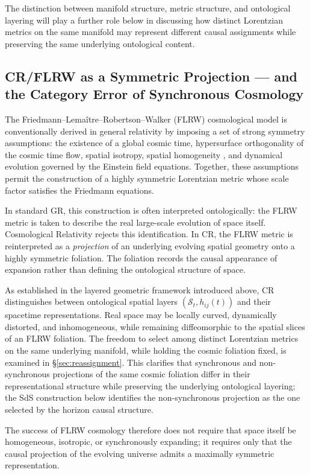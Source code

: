 \documentclass[11pt,a4paper]{article}
\theoremstyle{plain}
\theoremstyle{definition}
\theoremstyle{remark}
\begin{document}
The distinction between manifold structure, metric structure, and ontological layering will play a further role below in discussing how distinct Lorentzian metrics on the same manifold may represent different causal assignments while preserving the same underlying ontological content.

\subsection{CR/FLRW as a Symmetric Projection --- and the Category Error of Synchronous Cosmology}\label{sec:CR-FLRW}

The Friedmann--Lema\^itre--Robertson--Walker (FLRW) cosmological model is conventionally derived in general relativity by imposing a set of strong symmetry assumptions: the existence of a global cosmic time, hypersurface orthogonality of the cosmic time flow, spatial isotropy, spatial homogeneity \cite{Robertson1935,Walker1937}, and dynamical evolution governed by the Einstein field equations. Together, these assumptions permit the construction of a highly symmetric Lorentzian metric whose scale factor satisfies the Friedmann equations.

In standard GR, this construction is often interpreted ontologically: the FLRW metric is taken to describe the real large-scale evolution of space itself. Cosmological Relativity rejects this identification. In CR, the FLRW metric is reinterpreted as a \emph{projection} of an underlying evolving spatial geometry onto a highly symmetric foliation. The foliation records the causal appearance of expansion rather than defining the ontological structure of space.

As established in the layered geometric framework introduced above, CR distinguishes between ontological spatial layers $(\mathcal{S}_t,h_{ij}(t))$ and their spacetime representations. Real space may be locally curved, dynamically distorted, and inhomogeneous, while remaining diffeomorphic to the spatial slices of an FLRW foliation. The freedom to select among distinct Lorentzian metrics on the same underlying manifold, while holding the cosmic foliation fixed, is examined in \S\ref{sec:reassignment}. This clarifies that synchronous and non-synchronous projections of the same cosmic foliation differ in their representational structure while preserving the underlying ontological layering; the SdS construction below identifies the non-synchronous projection as the one selected by the horizon causal structure.

The success of FLRW cosmology therefore does not require that space itself be homogeneous, isotropic, or synchronously expanding; it requires only that the causal projection of the evolving universe admits a maximally symmetric representation.
\end{document}
